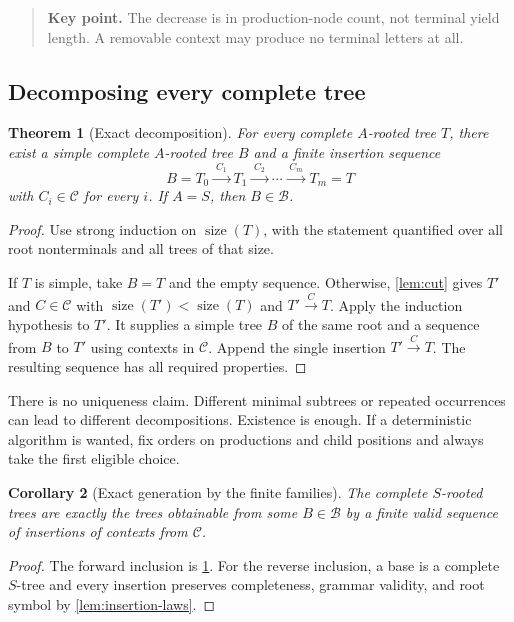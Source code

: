 \documentclass[11pt,a4paper]{article}
\numberwithin{equation}{section}
\theoremstyle{plain}
\newtheorem{theorem}{Theorem}[section]
\newtheorem{corollary}[theorem]{Corollary}
\theoremstyle{definition}
\theoremstyle{remark}
\newcommand{\sz}{\operatorname{size}}
\newcommand{\Bases}{\mathcal B}
\newcommand{\Cycles}{\mathcal C}
\newcommand{\ins}[1]{\xrightarrow{\;#1\;}}
\newcommand{\key}[1]{\begin{quote}\small\color{ink}\textbf{Key point.} #1\end{quote}}
\begin{document}
\key{The decrease is in production-node count, not terminal yield length. A removable context may produce no terminal letters at all.}

\subsection{Decomposing every complete tree}
\begin{theorem}[Exact decomposition]\label{thm:decomposition}
For every complete $A$-rooted tree $T$, there exist a simple complete $A$-rooted tree $B$ and a finite insertion sequence
\begin{equation}\label{eq:decomposition}
B=T_0\ins{C_1}T_1\ins{C_2}\cdots\ins{C_m}T_m=T
\end{equation}
with $C_i\in\Cycles$ for every $i$. If $A=S$, then $B\in\Bases$.
\end{theorem}
\begin{proof}
Use strong induction on $\sz(T)$, with the statement quantified over all root nonterminals and all trees of that size.

If $T$ is simple, take $B=T$ and the empty sequence. Otherwise, \cref{lem:cut} gives $T'$ and $C\in\Cycles$ with $\sz(T')<\sz(T)$ and $T'\ins C T$. Apply the induction hypothesis to $T'$. It supplies a simple tree $B$ of the same root and a sequence from $B$ to $T'$ using contexts in $\Cycles$. Append the single insertion $T'\ins C T$. The resulting sequence has all required properties.
\end{proof}

There is no uniqueness claim. Different minimal subtrees or repeated occurrences can lead to different decompositions. Existence is enough. If a deterministic algorithm is wanted, fix orders on productions and child positions and always take the first eligible choice.

\begin{corollary}[Exact generation by the finite families]\label{cor:finite-generation}
The complete $S$-rooted trees are exactly the trees obtainable from some $B\in\Bases$ by a finite valid sequence of insertions of contexts from $\Cycles$.
\end{corollary}
\begin{proof}
The forward inclusion is \cref{thm:decomposition}. For the reverse inclusion, a base is a complete $S$-tree and every insertion preserves completeness, grammar validity, and root symbol by \cref{lem:insertion-laws}.
\end{proof}
\end{document}
